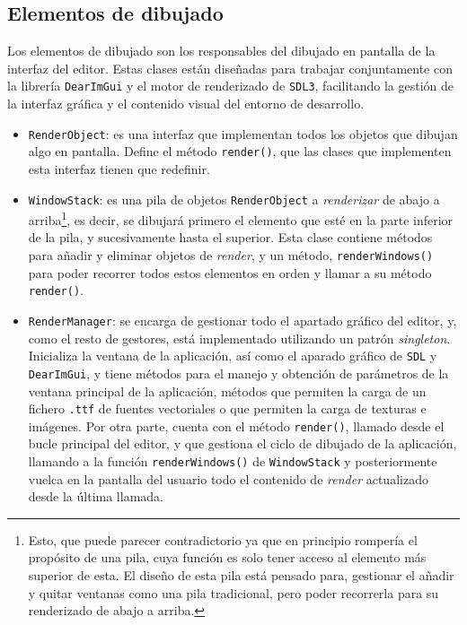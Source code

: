 \subsection{Elementos de dibujado}
\label{subsec:dibujado}
Los elementos de dibujado son los responsables del dibujado en pantalla de la interfaz del editor. Estas clases están diseñadas para trabajar conjuntamente con la librería \texttt{DearImGui} y el motor de renderizado de \texttt{SDL3}, facilitando la gestión de la interfaz gráfica y el contenido visual del entorno de desarrollo.

\begin{itemize}
	\item \texttt{RenderObject}: es una interfaz que implementan todos los objetos que dibujan algo en pantalla. Define el método \texttt{render()}, que las clases que implementen esta interfaz tienen que redefinir.
	\item \texttt{WindowStack}: es una pila de objetos \texttt{RenderObject} a \textit{renderizar} de abajo a arriba\footnote{Esto, que puede parecer contradictorio ya que en principio rompería el propósito de una pila, cuya función es solo tener acceso al elemento más superior de esta. El diseño de esta pila está pensado para, gestionar el añadir y quitar ventanas como una pila tradicional, pero poder recorrerla para su renderizado de abajo a arriba.}, es decir, se dibujará primero el elemento que esté en la parte inferior de la pila, y sucesivamente hasta el superior. Esta clase contiene métodos para añadir y eliminar objetos de \textit{render}, y un método, \texttt{renderWindows()} para poder recorrer todos estos elementos en orden y llamar a su método \texttt{render()}.
	\item \texttt{RenderManager}: se encarga de gestionar todo el apartado gráfico del editor, y, como el resto de gestores, está implementado utilizando un patrón \textit{singleton}. Inicializa la ventana de la aplicación, así como el aparado gráfico de \texttt{SDL} y \texttt{DearImGui}, y tiene métodos para el manejo y obtención de parámetros de la ventana principal de la aplicación, métodos que permiten la carga de un fichero \texttt{.ttf} de fuentes vectoriales o que permiten la carga de texturas e imágenes. Por otra parte, cuenta con el método \texttt{render()}, llamado desde el bucle principal del editor, y que gestiona el ciclo de dibujado de la aplicación, llamando a la función \texttt{renderWindows()} de \texttt{WindowStack} y posteriormente vuelca en la pantalla del usuario todo el contenido de \textit{render} actualizado desde la última llamada. 

\end{itemize}
